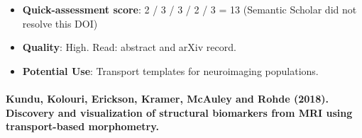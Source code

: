 \documentclass[journal,onecolumn]{IEEEtran}
\begin{document}
\begin{itemize}
\item{} \textbf{Quick-assessment score}: 2 / 3 / 3 / 2 / 3 = 13 (Semantic Scholar did not resolve this DOI)

\item{} \textbf{Quality}: High. Read: abstract and arXiv record.

\item{} \textbf{Potential Use}: Transport templates for neuroimaging populations.

\end{itemize}

\paragraph{Kundu, Kolouri, Erickson, Kramer, McAuley and Rohde (2018). Discovery and visualization of structural biomarkers from MRI using transport-based morphometry.~\cite{Kundu2018Discovery}}\mbox{}
\end{document}
